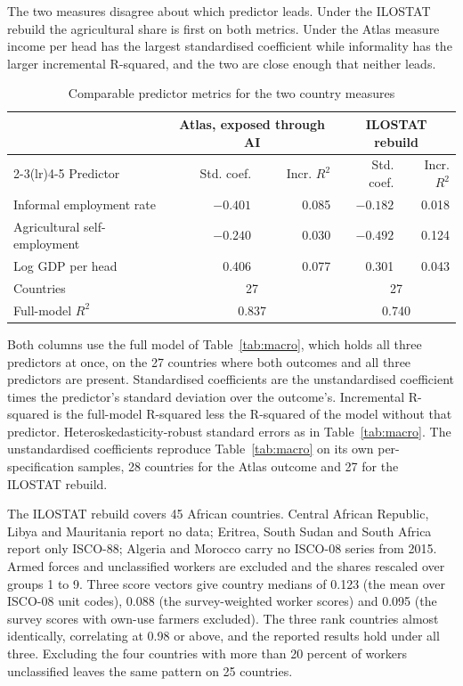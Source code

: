 The two measures disagree about which predictor leads. Under the ILOSTAT
rebuild the agricultural share is first on both metrics. Under the Atlas
measure income per head has the largest standardised coefficient while
informality has the larger incremental R-squared, and the two are close enough
that neither leads.

\begin{table}[ht]
\centering
\caption{Comparable predictor metrics for the two country measures}
\label{tab:fit}
\small
\begin{tabular}{lrrrr}
\toprule
 & \multicolumn{2}{c}{Atlas, exposed through AI} & \multicolumn{2}{c}{ILOSTAT rebuild} \\
\cmidrule(lr){2-3}\cmidrule(lr){4-5}
Predictor & Std. coef. & Incr. $R^2$ & Std. coef. & Incr. $R^2$ \\
\midrule
Informal employment rate     & $-0.401$ & 0.085 & $-0.182$ & 0.018 \\
Agricultural self-employment & $-0.240$ & 0.030 & $-0.492$ & 0.124 \\
Log GDP per head             & 0.406    & 0.077 & 0.301    & 0.043 \\
\midrule
Countries                    & \multicolumn{2}{c}{27} & \multicolumn{2}{c}{27} \\
Full-model $R^2$             & \multicolumn{2}{c}{0.837} & \multicolumn{2}{c}{0.740} \\
\bottomrule
\end{tabular}

\vspace{4pt}
\begin{minipage}{0.94\linewidth}
\footnotesize
Both columns use the full model of Table~\ref{tab:macro}, which holds all three
predictors at once, on the 27 countries where both outcomes and all three
predictors are present. Standardised coefficients are the unstandardised
coefficient times the predictor's standard deviation over the outcome's.
Incremental R-squared is the full-model R-squared less the R-squared of the
model without that predictor. Heteroskedasticity-robust standard errors as in
Table~\ref{tab:macro}. The unstandardised coefficients reproduce
Table~\ref{tab:macro} on its own per-specification samples, 28 countries for
the Atlas outcome and 27 for the ILOSTAT rebuild.
\end{minipage}
\end{table}

The ILOSTAT rebuild covers 45 African countries. Central African Republic, Libya
and Mauritania report no data; Eritrea, South Sudan and South Africa report only
ISCO-88; Algeria and Morocco carry no ISCO-08 series from 2015. Armed forces and
unclassified workers are excluded and the shares rescaled over groups 1 to 9.
Three score vectors give country medians of 0.123 (the mean over ISCO-08 unit
codes), 0.088 (the survey-weighted worker scores) and 0.095 (the survey scores
with own-use farmers excluded). The three rank countries almost identically,
correlating at 0.98 or above, and the reported results hold under all three.
Excluding the four countries with more than 20 percent of workers unclassified
leaves the same pattern on 25 countries.


